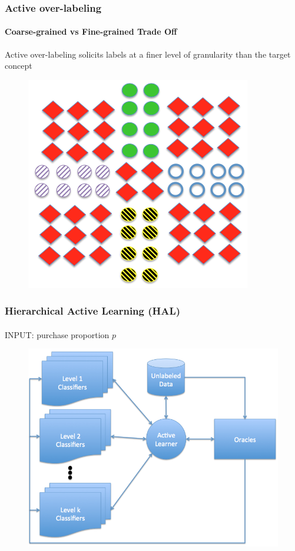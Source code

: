 \documentclass{beamer}
\begin{document}
\begin{frame}
    \frametitle{Active over-labeling}  %
    \framesubtitle{Coarse-grained vs Fine-grained Trade Off}
    \par Active over-labeling solicits labels at a finer level of granularity than the target concept
    \begin{figure}[!htb]
	\centering
    \includegraphics[width=0.6\columnwidth]{fig/union}
    \label{fig:union}
\end{figure}
\end{frame}
\begin{frame}
    \frametitle{Hierarchical Active Learning (HAL)}  %
    \framesubtitle{}
    \par INPUT: purchase proportion $p$
    \begin{figure}[!htb]
        \centering
        \includegraphics[width=0.65\columnwidth]{fig/AL2}
        \label{fig:HALapproach}
    \end{figure}
\end{frame}
\end{document}
